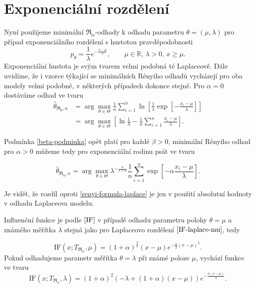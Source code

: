 \section{Exponenciální rozdělení} %

Nyní použijeme minimální $\mathfrak{R}_\alpha$-odhady k odhadu parametru $\theta = (\mu,\lambda)$ pro případ exponenciálního rozdělení s hustotou pravděpodobnosti
\begin{equation}
	p_\theta = \frac{1}{\lambda} e^{-\frac{x-\mu}{\lambda}}, \qquad \mu\in \mathbb{R},\, \lambda>0, \, x\geq\mu.
\end{equation}
\noindent Exponenciální hustota je svým tvarem velmi podobná té Laplaceově. Dále uvidíme, že i vzorce týkající se minimálních Rényiho odhadů vycházejí pro oba modely velmi podobně, v některých případech dokonce stejně.  Pro $\alpha = 0$ dostáváme odhad ve tvaru
\begin{align}
	\hat{\theta}_{\mathfrak{R}_0,n} & =  \arg \max_{\theta \in \Theta} \frac{1}{n} \sum^n_{i=1} \ln \left[ \frac{1}{\lambda}\exp \left[-\frac{x_i-\mu}{\lambda} \right] \right] \nonumber \\
	& =  \arg \max_{\theta \in \Theta} \left[ \ln \frac{1}{\lambda} - \frac{1}{n} \sum^n_{i=1} \frac{x_i-\mu}{\lambda} \right].
\end{align}

\noindent Podmínka \ref{beta-podminka} opět platí pro každé $\beta>0$, minimální Rényiho odhad pro $\alpha>0$ můžeme tedy pro exponenciální rodinu psát ve tvaru

\begin{equation}
	\hat{\theta}_{\mathfrak{R}_\alpha,n} = \arg \max_{\theta \in \Theta} \lambda^{-\frac{\alpha}{1+\alpha}} \frac{1}{n}\sum_{i=1}^n \exp \left[-\alpha\frac{x_i-\mu}{\lambda} \right].
	\label{renyi-formula-exponential}
\end{equation}

\noindent Je vidět, že rozdíl oproti \eqref{renyi-formula-laplace} je jen v použití absolutní hodnoty v odhadu Laplaceova modelu. 

Influenční funkce je podle $\eqref{IF}$ v případě odhadu parametru polohy $\theta = \mu$ a známého měřítka $ \lambda$ stejná jako pro Laplaceovo rozdělení $\eqref{IF-laplace-mu}$, tedy 

\begin{equation}
	\mathrm{IF}(x;T_{\mathfrak{R}_\alpha},\mu) = (1+\alpha )^{\frac{3}{2}} (x-\mu )  e^{-\frac{\alpha}{2} (x-\mu )^2}. %
	\label{IF-exponential-mu}
\end{equation}
Pokud odhadujeme parametr měřítka $\theta = \lambda$ při známé poloze $ \mu $, vychází funkce ve tvaru
\begin{equation}
	\mathrm{IF}(x;T_{\mathfrak{R}_\alpha},\lambda) =	(1+\alpha )^2 \left( - \lambda +(1+ \alpha)(x-\mu)\right) e^{-\frac{\alpha (x-\mu)}{\lambda }}. %
	\label{IF-exponential-lambda}
\end{equation}

